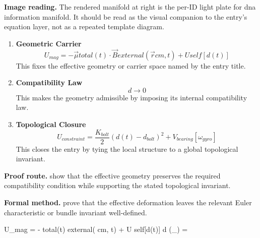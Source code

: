 \begin{samepage}
\noindent\begin{minipage}[t]{0.45\linewidth}
\vspace{0pt}
\raggedright
\scriptsize\textbf{Image reading.} The rendered manifold at right is the per-ID light plate for dna information manifold. It should be read as the visual companion to the entry's equation layer, not as a repeated template diagram.\par
\end{minipage}\hfill
\begin{minipage}[t]{0.53\linewidth}
\vspace*{-0.10in}
\raggedright
{}
\end{minipage}
\end{samepage}

\clearpage


\begin{enumerate}[leftmargin=1.6em,itemsep=9pt,topsep=6pt]
\item \textbf{Geometric Carrier}
\[
U_{mag} = -\vec{\mu} {total}(t) \cdot \vec{B} {external}(\vec{r} {cm}, t) + U {self}[d(t)]
\]
This fixes the effective geometry or carrier space named by the entry title.

\item \textbf{Compatibility Law}
\[
d \to 0
\]
This makes the geometry admissible by imposing its internal compatibility law.

\item \textbf{Topological Closure}
\[
U_{constraint} = \frac{K_{bolt}}{2}(d(t)-d_{bolt})^{2} + V_{bearing}[\omega_{gyro}]
\]
This closes the entry by tying the local structure to a global topological invariant.
\end{enumerate}

\textbf{Proof route.} show that the effective geometry preserves the required compatibility condition while supporting the stated topological invariant.

\textbf{Formal method.} prove that the effective deformation leaves the relevant Euler characteristic or bundle invariant well-defined.

\medskip
{}

\begin{tzpsnapshot}
\end{tzpsnapshot}

\tzpequationlinks
  {U_{mag} = -\vec{\mu} {total}(t) \cdot {} {external}( {cm}, t) + U {self}[d(t)]}
  {d }
  {\chi(_{}) = \cdots}
